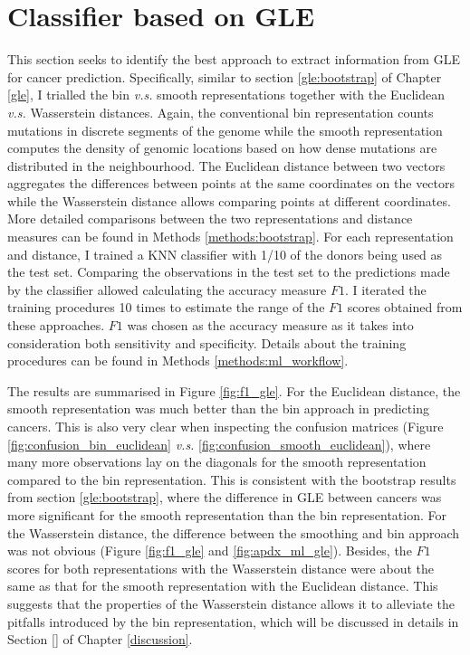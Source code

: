 \section{Classifier based on GLE}\label{ml:gle}
This section seeks to identify the best approach to extract information from GLE for cancer prediction. Specifically, similar to section \ref{gle:bootstrap} of Chapter \ref{gle}, I trialled the bin \textit{v.s.} smooth representations together with the Euclidean \textit{v.s.} Wasserstein distances. Again, the conventional bin representation counts mutations in discrete segments of the genome while the smooth representation computes the density of genomic locations based on how dense mutations are distributed in the neighbourhood. The Euclidean distance between two vectors aggregates the differences between points at the same coordinates on the vectors while the Wasserstein distance allows comparing points at different coordinates. More detailed comparisons between the two representations and distance measures can be found in Methods \ref{methods:bootstrap}. For each representation and distance, I trained a KNN classifier with 1/10 of the donors being used as the test set. Comparing the observations in the test set to the predictions made by the classifier allowed calculating the accuracy measure $F1$. I iterated the training procedures 10 times to estimate the range of the $F1$ scores obtained from these approaches. $F1$ was chosen as the accuracy measure as it takes into consideration both sensitivity and specificity. Details about the training procedures can be found in Methods \ref{methods:ml_workflow}.

The results are summarised in Figure \ref{fig:f1_gle}. For the Euclidean distance, the smooth representation was much better than the bin approach in predicting cancers. This is also very clear when inspecting the confusion matrices (Figure \ref{fig:confusion_bin_euclidean} \textit{v.s.} \ref{fig:confusion_smooth_euclidean}), where many more observations lay on the diagonals for the smooth representation compared to the bin representation. This is consistent with the bootstrap results from section \ref{gle:bootstrap}, where the difference in GLE between cancers was more significant for the smooth representation than the bin representation. For the Wasserstein distance, the difference between the smoothing and bin approach was not obvious (Figure \ref{fig:f1_gle} and \ref{fig:apdx_ml_gle}). Besides, the $F1$ scores for both representations with the Wasserstein distance were about the same as that for the smooth representation with the Euclidean distance. This suggests that the properties of the Wasserstein distance allows it to alleviate the pitfalls introduced by the bin representation, which will be discussed in details in Section \ref{} of Chapter \ref{discussion}. 

